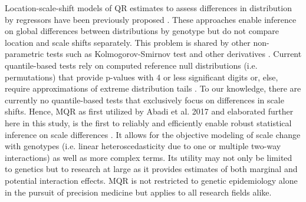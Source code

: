 \documentclass[12pt]{article}
\begin{document}
Location-scale-shift models of QR estimates to assess differences in distribution by regressors have been previously proposed \cite{khmaladze1982martingale, koenker2002inference, aschard2013nonparametric}. These approaches enable inference on global differences between distributions by genotype but do not compare location and scale shifts separately. This problem is shared by other non-parametric tests such as Kolmogorov-Smirnov test and other derivatives \cite{massey1951kolmogorov, hart2001mann}. Current quantile-based tests rely on computed reference null distributions (i.e. permutations) that provide p-values with 4 or less significant digits or, else, require approximations of extreme distribution tails \cite{knijnenburg2009fewer}. To our knowledge, there are currently no quantile-based tests that exclusively focus on differences in scale shifts. Hence, MQR as first utilized by Abadi et al. 2017 and elaborated further here in this study, is the first to reliably and efficiently enable robust statistical inference on scale differences \cite{abadi2017penetrance}. It allows for the objective modeling of scale change with genotypes (i.e. linear heteroscedasticity due to one or multiple two-way interactions) as well as more complex terms. Its utility may not only be limited to genetics but to research at large as it provides estimates of both marginal and potential interaction effects. MQR is not restricted to genetic epidemiology alone in the pursuit of precision medicine but applies to all research fields alike. 
\end{document}
